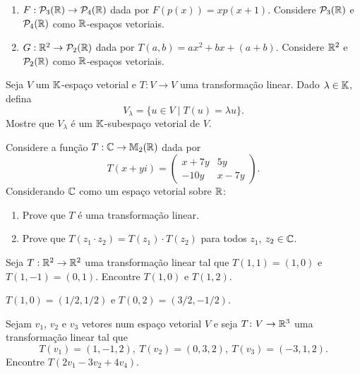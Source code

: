 \documentclass[12pt]{exam}
\begin{document}
\begin{exercicio}
\begin{enumerate}[label={\alph*})]
    \item $F : \mathcal{P}_3(\mathbb{R}) \to \mathcal{P}_4(\mathbb{R})$ dada por $F(p(x)) = xp(x + 1)$. Considere $\mathcal{P}_3(\mathbb{R})$ e $\mathcal{P}_4(\mathbb{R})$ como $\mathbb{R}$-espaços vetoriais.

    \item $G : \mathbb{R}^2 \to \mathcal{P}_2(\mathbb{R})$ dada por $T(a,b) = ax^2 + bx + (a + b)$. Considere $\mathbb{R}^2$ e $\mathcal{P}_2(\mathbb{R})$ como $\mathbb{R}$-espaços vetoriais.
  \end{enumerate}
\end{exercicio}

\begin{exercicio}
  Seja $V$ um $\mathbb{K}$-espaço vetorial e $T : V \to V$ uma transformação linear. Dado $\lambda \in \mathbb{K}$, defina
  \[
      V_\lambda = \{ u \in V \mid T(u) = \lambda u\}.
  \]
  Mostre que $V_\lambda$ é um $\mathbb{K}$-subespaço vetorial de $V$.
\end{exercicio}

\begin{exercicio}
  Considere a função $T : \mathbb{C} \to \mathbb{M}_2(\mathbb{R})$ dada por
  \[
      T(x + yi) = \begin{pmatrix}
                        x + 7y & 5y\\
                       -10y & x - 7y
                   \end{pmatrix}.
  \]
  Considerando $\mathbb{C}$ como um espaço vetorial sobre $\mathbb{R}$:
  \begin{enumerate}[label={\alph*})]
    \item Prove que $T$ é uma transformação linear.

    \item Prove que $T(z_1\cdot z_2) = T(z_1)\cdot T(z_2)$ para todos $z_1$, $z_2 \in \mathbb{C}$.
  \end{enumerate}
\end{exercicio}

\begin{exercicio}
  Seja $T : \mathbb{R}^2 \to \mathbb{R}^2$ uma transformação linear tal que $T(1,1) = (1,0)$ e $T(1,-1) = (0,1)$. Encontre $T(1,0)$ e $T(1,2)$.
  \begin{solucao}
    $T(1,0) = (1/2,1/2)$ e $T(0,2) = (3/2,-1/2)$.
  \end{solucao}
\end{exercicio}

\begin{exercicio}
  Sejam $v_1$, $v_2$ e $v_3$ vetores num espaço vetorial $V$ e seja $T \colon V \to \mathbb{R}^3$ uma transformação linear tal que
  \[
    T(v_1) = (1, -1, 2), \ T(v_2) = (0, 3, 2), \ T(v_3) = (-3, 1, 2).
  \]
  Encontre $T(2v_1 - 3v_2 + 4v_4)$.
\end{exercicio}
\end{document}
